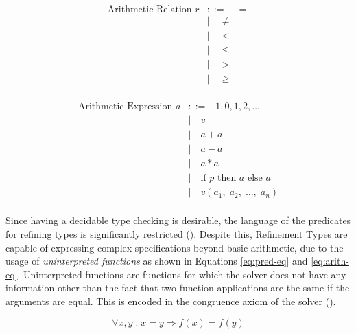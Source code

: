 \begin{minipage}[t]{0.5\linewidth}
  \begin{equation}
  \begin{split}
  \text{Arithmetic Relation } r &::= \quad = \\
    &| \quad \neq \\
    &| \quad < \\
    &| \quad \le  \\
    &| \quad > \\
    &| \quad \ge \\
  \end{split}
  \end{equation}
\end{minipage}
\hfill
\begin{minipage}[t]{0.5\linewidth}
  \begin{equation}
  \label{eq:arith-eq}
  \begin{split}
  \text{Arithmetic Expression } a &::= -1,0,1,2,\dots \\
    &| \quad v \\
    &| \quad a + a \\
    &| \quad a - a  \\
    &| \quad a * a \\
    &| \quad \text{if } p \text{ then } a \text{ else } a \\
    &| \quad v(a_1, \; a_2, \; \dots, \; a_n) \\
  \end{split}
  \end{equation}
\end{minipage}
\vspace{1em}

Since having a decidable type checking is desirable, the language of the predicates for refining types 
is significantly restricted (). Despite this, Refinement Types are capable of expressing 
complex specifications beyond basic arithmetic, due to the usage of \emph{uninterpreted functions} as 
shown in Equations \ref{eq:pred-eq} and \ref{eq:arith-eq}. Uninterpreted functions are functions for 
which the solver does not have any information other than the fact that two function applications are 
the same if the arguments are equal. This is encoded in the congruence axiom of the solver 
().

\begin{equation} \label{eq:congruence}
\forall x,y \; . \; x = y \Rightarrow f(x) = f(y)
\end{equation}

